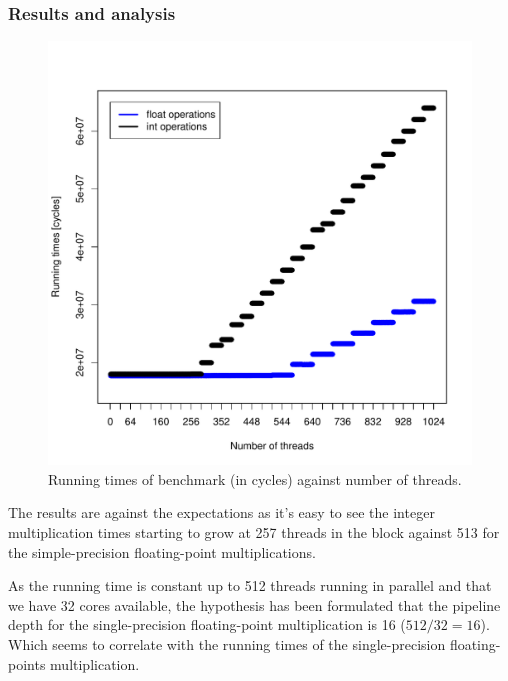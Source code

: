 \documentclass{report}
\def \scalingfactor{.8}
\begin{document}
	\subsubsection{Results and analysis}
    \begin{figure}[H]
    	\centering
		\vspace{-20pt}
	    \includegraphics[width=\scalingfactor\linewidth]{"graphics/float_vs_int_running_times"}
		\vspace{-15pt}
		\captionsetup{justification=centering}
        \caption{Running times of benchmark (in cycles) against number of threads.}
    \end{figure}
	
    The results are against the expectations as it's easy to see the integer
    multiplication times starting to grow at 257 threads in the block against
    513 for the simple-precision floating-point multiplications.
    
    As the running time is constant up to 512 threads running in parallel and that we have 32 cores
    available, the hypothesis has been formulated that the pipeline depth for the single-precision 
    floating-point multiplication is 16 ($512/32 = 16$). Which seems to correlate with the running
    times of the single-precision floating-points multiplication. 
    
\end{document}
